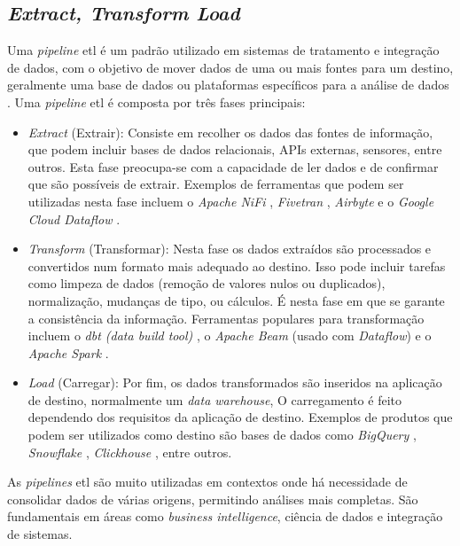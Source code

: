 \subsection{\textit{Extract, Transform Load}}
\label{ch:etl}

Uma \textit{pipeline} \gls{etl} é um padrão utilizado em sistemas de tratamento e integração de dados, com o objetivo de mover dados de uma ou mais fontes para um destino, geralmente uma base de dados ou plataformas específicos para a análise de dados \cite{vassiliadis2009survey}. Uma \textit{pipeline} \gls{etl} é composta por três fases principais:

\begin{itemize}
  \item \textit{Extract} (Extrair): Consiste em recolher os dados das fontes de informação, que podem incluir bases de dados relacionais, APIs externas, sensores, entre outros. Esta fase preocupa-se com a capacidade de ler dados e de confirmar que são possíveis de extrair.  Exemplos de ferramentas que podem ser utilizadas nesta fase incluem o \textit{Apache NiFi} \cite{apache_nifi}, \textit{Fivetran} \cite{fivetran}, \textit{Airbyte} \cite{airbyte} e o \textit{Google Cloud Dataflow} \cite{dataflow}.
  
  \item \textit{Transform} (Transformar): Nesta fase os dados extraídos são processados e convertidos num formato mais adequado ao destino. Isso pode incluir tarefas como limpeza de dados (remoção de valores nulos ou duplicados), normalização, mudanças de tipo, ou cálculos. É nesta fase em que se garante a consistência da informação. Ferramentas populares para transformação incluem o \textit{dbt (data build tool)} \cite{dbt}, o \textit{Apache Beam} \cite{apache_beam} (usado com \textit{Dataflow}) e o \textit{Apache Spark} \cite{apache_spark}.

  \item \textit{Load} (Carregar): Por fim, os dados transformados são inseridos na aplicação de destino, normalmente um \textit{data warehouse},  O carregamento é feito dependendo dos requisitos da aplicação de destino. Exemplos de produtos que podem ser utilizados como destino são bases de dados como \textit{BigQuery} \cite{bigquery}, \textit{Snowflake} \cite{snowflake}, \textit{Clickhouse} \cite{clickhouse}, entre outros.

\end{itemize}

As \textit{pipelines} \gls{etl} são muito utilizadas em contextos onde há necessidade de consolidar dados de várias origens, permitindo análises mais completas. São fundamentais em áreas como \textit{business intelligence}, ciência de dados e integração de sistemas.


